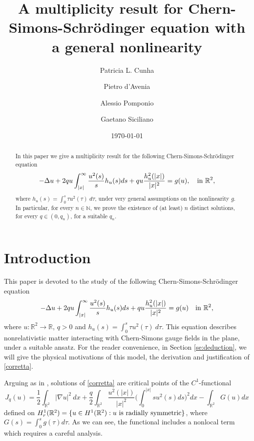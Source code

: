 \documentclass[11pt,leqno,twoside,reqno]{amsart}
\title[Chern-Simons-Schr\"odinger equation]{A multiplicity result for Chern-Simons-Schr\"odinger equation with a general nonlinearity}
\author[P. L. Cunha]{Patricia L. Cunha}
\author[P. d'Avenia]{Pietro d'Avenia}
\author[A. Pomponio]{Alessio Pomponio}
\author[G. Siciliano]{Gaetano Siciliano}
\date{\today}
\numberwithin{equation}{section}
\begin{document}

\begin{abstract}
In this paper we give a multiplicity result for the following Chern-Simons-Schr\"{o}dinger equation
\begin{equation*}
-\Delta u+2q u \int_{|x|}^{\infty}\frac{u^{2}(s)}{s}h_u(s)ds  +q u\frac{h^{2}_u(|x|)}{|x|^{2}} = g(u), \quad\hbox{in }{{\mathbb{R}^2}},
\end{equation*}
where $\displaystyle h_u(s)=\int_0^s \tau u^2(\tau) \ d \tau$, under very general assumptions on the nonlinearity $g$. 
In particular, for every $n\in \mathbb N$, we prove the existence of (at least) $n$ distinct solutions, 
for every $q\in (0,q_{n})$, for a suitable $q_n$. 
\end{abstract}

\maketitle

\section{Introduction}

This paper is devoted to the study of the following Chern-Simons-Schr\"{o}dinger equation
\begin{equation}\label{corretta}
-\Delta u+2q u \int_{|x|}^{\infty}\frac{u^{2}(s)}{s}h_u(s)ds  +q u\frac{h^{2}_u(|x|)}{|x|^{2}} = g(u) \quad\hbox{in }{{\mathbb{R}^2}},
\end{equation}
where $u:\mathbb R^{2}\to \mathbb R$, $q>0$
and $ h_u(s)=\int_0^s \tau u^2(\tau) \ d \tau$. This equation describes nonrelativistic matter interacting with Chern-Simons gauge 
fields in the plane, under a suitable ansatz.
For the reader convenience, in Section \ref{se:deduction}, we will give the physical motivations of this model, the derivation and 
justification of \eqref{corretta}.  

Arguing as in \cite[Proposition 2.2]{BHS}, solutions of \eqref{corretta} are critical points of the $C^1$-functional 
\begin{equation}\label{J}
J_q(u)=\frac{1}{2}{\int_{{\mathbb{R}^2}}} |\nabla u|^{2} \ dx+\frac{q}{2}\int_{\mathbb R^{2}}
\frac{u^{2}(|x|)}{|x|^{2}} \Big(\int_{0}^{|x|}s u^{2}(s)ds\Big)^{2}dx- \int_{\mathbb R^{2}}G(u)dx
\end{equation}
defined on $H_r^1({{\mathbb{R}^2}})=\{u\in H^1({{\mathbb{R}^2}}): u \hbox{ is radially symmetric}\}$, where $G(s)=\int_{0}^{s}g(\tau)d\tau$. 
As we can see, the functional includes a nonlocal term which requires a careful analysis.
\end{document}
